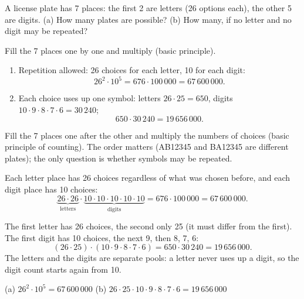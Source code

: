 
\begin{problem}
	A license plate has 7 places: the first 2 are letters (26 options each), the
	other 5 are digits. (a) How many plates are possible? (b) How many, if no
	letter and no digit may be repeated?
\end{problem}

\begin{slides}
	\small
	\exstatement
	\pause
	\sol Fill the 7 places one by one and multiply (basic principle).
	\begin{enumerate}
		\item[(a)] Repetition allowed: 26 choices for each letter, 10 for each
		      digit:
		      \[ 26^2\cdot 10^5 = 676\cdot 100\,000 = 67\,600\,000. \]
		\item[(b)] Each choice uses up one symbol: letters $26\cdot 25=650$,
		      digits $10\cdot 9\cdot 8\cdot 7\cdot 6=30\,240$;
		      \[ 650\cdot 30\,240 = 19\,656\,000. \]
	\end{enumerate}
\end{slides}

\begin{solution}
	\idea Fill the 7 places one after the other and multiply the numbers of
	choices (basic principle of counting). The order matters (AB12345 and
	BA12345 are different plates); the only question is whether symbols may be
	repeated.

	 Each letter place has 26 choices regardless of
	what was chosen before, and each digit place has 10 choices:
	\[ \underbrace{26\cdot26}_{\text{letters}}\cdot
		\underbrace{10\cdot10\cdot10\cdot10\cdot10}_{\text{digits}}
		= 676\cdot100\,000 = 67\,600\,000. \]

	 The first letter has 26 choices, the second only
	25 (it must differ from the first). The first digit has 10 choices, the next
	9, then 8, 7, 6:
	\[ (26\cdot25)\cdot(10\cdot9\cdot8\cdot7\cdot6) = 650\cdot30\,240
		= 19\,656\,000. \]
	The letters and the digits are separate pools: a letter never uses up a
	digit, so the digit count starts again from 10.

	\begin{answer}
		(a) $26^2\cdot10^5 = 67\,600\,000$ \qquad
		(b) $26\cdot25\cdot10\cdot9\cdot8\cdot7\cdot6 = 19\,656\,000$
	\end{answer}

\end{solution}
